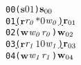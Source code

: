 \newcommand{\epsnd}{\textit{$N_s$}}
\newcommand{\eprcv}{\textit{$N_r$}}
\newcommand{\epwait}{\textit{$P_r$}}
\newcommand{\epbarrier}{\textit{$P_b$}}
\newcommand{\frm}{\textit{frm}}
\newcommand{\vbot}{\textit{v$-\bot$}}
\newcommand{\status}{\textit{s}}
\newcommand{\error}{\ensuremath{\mathbf{error}}}
\newcommand{\aidmap}{\textit{A}}
\newcommand{\thread}{\ensuremath{\mathit{p}}}
\newcommand{\aid}{\ensuremath{\mathit{x}}}
\newcommand{\num}{\ensuremath{\mathit{v}}}
\newcommand{\rcvp}{\ensuremath{\mathit{pt}}}
\newcommand{\npro}{\ensuremath{\mathit{n}}}
\newcommand{\cmd}{\ensuremath{\mathit{e}}}
\newcommand{\op}{\ensuremath{\mathit{op}}}
\newcommand{\comm}{\ensuremath{\mathit{cm}}}
\newcommand{\applyop}{\ensuremath{\mathrm{op}}}
\newcommand{\wait}{\ensuremath{\mathbf{w}}}
\newcommand{\sendi}{\ensuremath{\mathbf{s}}}
\newcommand{\recvi}{\ensuremath{\mathbf{r}}}
\newcommand{\barrier}{\ensuremath{\mathbf{b}}}
\newcommand{\traceentry}{\ensuremath{\sigma}}
\newcommand{\movelist}{\ensuremath{\delta}}
\newcommand{\ep}{\ensuremath{\mathbf{\gamma}}}
\newcommand{\src}{\ensuremath{\alpha}}
\newcommand{\dst}{\ensuremath{\beta}}
\newcommand{\true}{\ensuremath{\mathbf{true}}}
\newcommand{\false}{\ensuremath{\mathbf{false}}}
\newcommand{\match}{\ensuremath{\mathrm{m}}}
\newcommand{\matchl}{\ensuremath{\mathrm{match}}}
\newcommand{\findrecv}{\ensuremath{\mathrm{search_r}}}
\newcommand{\smt}{\ensuremath{\mathit{smt}}}

\newcommand{\statuschange}{\left\{ \begin{array}{ll}  \status &\ \mathrm{if}\ |\epsnd(\dst)(\src)|>0\\
   \mathit{error} &\  \mathrm{otherwise}\end{array}\right .}

\newcommand{\reduce}[1]{\ensuremath{\rightarrow_{#1}}}
\newcommand{\reduceK}[1]{\ensuremath{\rightarrow_{#1}^{*}}}
\newcommand{\reduceN}[1]{\ensuremath{\dashrightarrow_{#1}}}
\newcommand{\reduceNK}[1]{\ensuremath{\dashrightarrow_{#1}^{*}}}
\newcommand{\mt}{\ensuremath{mt}}
\newcommand{\trace}{\ensuremath{\mathit{trace}}}
\newcommand{\movebot}{\ensuremath{\mathit{m}}}
\newcommand{\ret}{\ensuremath{\mathbf{ret}}}


\newsavebox{\boxTZero}
\begin{lrbox}{\boxTZero}
\begin{minipage}[t]{0.65\linewidth}
\large
\begin{alltt}
00 (\(\mathbf{s}\) \(\mathit{0 1}\)) \(\mathbf{s}\sb{00}\)
01 \underline{(\(\mathbf{r}\) \(\mathit{r\sb{0}}\) \(\mathit{\ast 0}\) \(\mathit{w\sb{0}}\)) \(\mathbf{r}\sb{01}\)}
02 (\(\mathbf{w}\) \(\mathit{w\sb{0}}\) \(\mathit{r\sb{0}}\)) \(\mathbf{w}\sb{02}\)
03 \underline{(\(\mathbf{r}\) \(\mathit{r\sb{1}}\) \(\mathit{1 0}\) \(\mathit{w\sb{1}}\)) \(\mathbf{r}\sb{03}\)}
04 (\(\mathbf{w}\) \(\mathit{w\sb{1}}\) \(\mathit{r\sb{1}}\)) \(\mathbf{w}\sb{04}\)
\end{alltt}
\end{minipage}
\end{lrbox}


